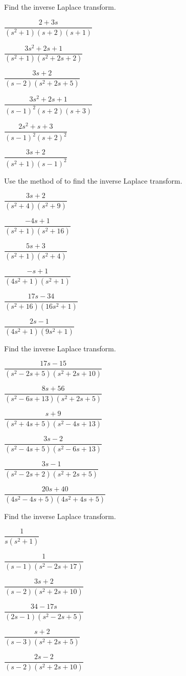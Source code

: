\begin{exerciselist}
\item\label{exer:8.2.4}Find the inverse Laplace transform.

\begin{alist*}[columns=2]
\item $\dfrac{2+3s}{(s^2+1)(s+2)(s+1)}$
\item $\dfrac{3s^2+2s+1}{(s^2+1)(s^2+2s+2)}$
\item $\dfrac{3s+2}{(s-2)(s^2+2s+5)}$
\item $\dfrac{3s^2+2s+1}{(s-1)^2(s+2)(s+3)}$
\item $\dfrac{2s^2+s+3}{(s-1)^2(s+2)^2}$
\item $\dfrac{3s+2}{(s^2+1)(s-1)^2}$
\end{alist*}

\item\label{exer:8.2.5}Use the method of   to find the inverse Laplace transform.

\begin{alist*}[columns=3]
\item $\dfrac{3s+2}{(s^2+4)(s^2+9)}$
\item $\dfrac{-4s+1}{(s^2+1)(s^2+16)}$
\item $\dfrac{5s+3}{(s^2+1)(s^2+4)}$
\item $\dfrac{-s+1}{(4s^2+1)(s^2+1)}$
\item $\dfrac{17s-34}{(s^2+16)(16s^2+1)}$
\item $\dfrac{2s-1}{(4s^2+1)(9s^2+1)}$
\end{alist*}


\item\label{exer:8.2.6}Find the inverse Laplace transform.

\begin{alist*}[columns=2]
\item $\dfrac{17 s-15}{(s^2-2s+5)(s^2+2s+10)}$
\item $\dfrac{8s+56}{(s^2-6s+13)(s^2+2s+5)}$
\item $\dfrac{s+9}{(s^2+4s+5)(s^2-4s+13)}$
\item $\dfrac{3s-2}{(s^2-4s+5)(s^2-6s+13)}$
\item $\dfrac{3s-1}{(s^2-2s+2)(s^2+2s+5)}$
\item $\dfrac{20s+40}{(4s^2-4s+5)(4s^2+4s+5)}$
\end{alist*}

\item\label{exer:8.2.7}Find the inverse Laplace transform.

\begin{alist*}[columns=2]
\item $\dfrac{1}{s(s^2+1)}$
\item $\dfrac{1}{(s-1)(s^2-2s+17)}$
\item $\dfrac{3s+2}{(s-2)(s^2+2s+10)}$
\item $\dfrac{34-17s}{(2s-1)(s^2-2s+5)}$
\item $\dfrac{s+2}{(s-3)(s^2+2s+5)}$
\item $\dfrac{2s-2}{(s-2)(s^2+2s+10)}$
\end{alist*}


\end{exerciselist}
